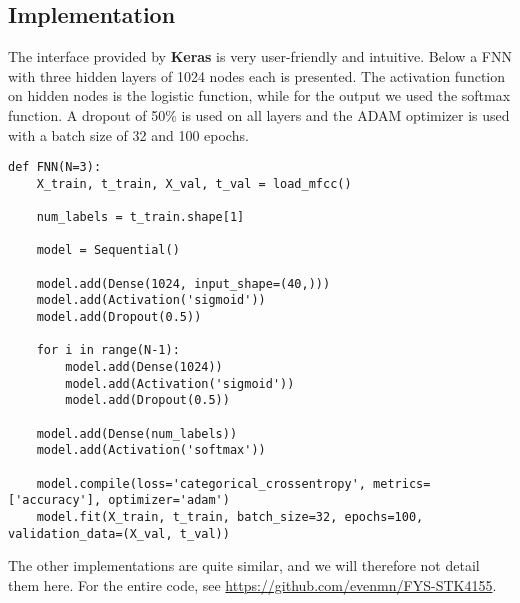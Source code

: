 \subsection{Implementation}
The interface provided by \textbf{Keras} is very user-friendly and intuitive. Below a FNN with three hidden layers of 1024 nodes each is presented. The activation function on hidden nodes is the logistic function, while for the output we used the softmax function. A dropout of 50\% is used on all layers and the ADAM optimizer is used with a batch size of 32 and 100 epochs. 
\lstset{basicstyle=\scriptsize}
\begin{lstlisting}
def FNN(N=3):
    X_train, t_train, X_val, t_val = load_mfcc()

    num_labels = t_train.shape[1]

    model = Sequential()

    model.add(Dense(1024, input_shape=(40,)))
    model.add(Activation('sigmoid'))
    model.add(Dropout(0.5))

    for i in range(N-1):
        model.add(Dense(1024))
        model.add(Activation('sigmoid'))
        model.add(Dropout(0.5))

    model.add(Dense(num_labels))
    model.add(Activation('softmax'))

    model.compile(loss='categorical_crossentropy', metrics=['accuracy'], optimizer='adam')
    model.fit(X_train, t_train, batch_size=32, epochs=100, validation_data=(X_val, t_val))
\end{lstlisting}
The other implementations are quite similar, and we will therefore not detail them here. For the entire code, see \url{https://github.com/evenmn/FYS-STK4155}.
